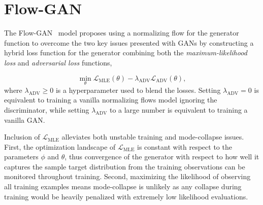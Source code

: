 \section{Flow-GAN}\label{sec:flow-gan}

The Flow-GAN~\cite{flow_gan} model proposes using a normalizing flow for the generator function to overcome the two
key issues presented with GANs by constructing a hybrid loss function for the generator combining both the
\textit{maximum-likelihood loss} and \textit{adversarial loss} functions,

\begin{equation*}
    \min_{\theta} \mathcal{L}_{\text{MLE}}(\theta) - \lambda_{\text{ADV}} \mathcal{L}_{\text{ADV}}(\theta),
    \label{eq:flowgan_loss}
\end{equation*}
where $\lambda_{\text{ADV}} \geq 0$ is a hyperparameter used to blend the losses.
Setting $\lambda_{\text{ADV}} = 0$ is equivalent to training a vanilla normalizing flows model ignoring the discriminator,
while setting $\lambda_{\text{ADV}}$ to a large number is equivalent to training a vanilla GAN\@.

Inclusion of $\mathcal{L}_{\text{MLE}}$ alleviates both unstable training and mode-collapse issues.
First, the optimization landscape of $\mathcal{L}_{\text{MLE}}$ is constant with respect to the parameters $\phi$ and
$\theta$, thus convergence of the generator with respect to how well it captures the sample target distribution from the
training observations can be monitored throughout training.
Second, maximizing the likelihood of observing all training examples means mode-collapse is unlikely as any collapse
during training would be heavily penalized with extremely low likelihood evaluations.
